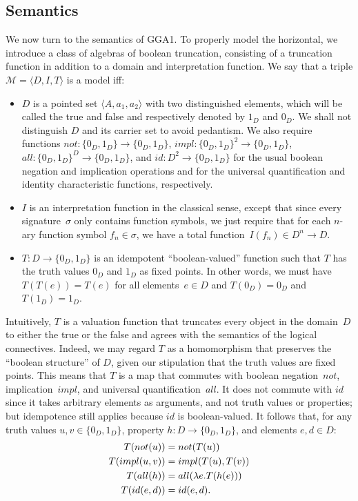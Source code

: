 \documentclass{preprint}
\newcommand{\bool}{\{0_D,1_D\}}
\newcommand{\GGA}{\textsf{GGA1}}
\begin{document}
\subsection{Semantics} \label{semantics}

We now turn to the semantics of \GGA. To properly model the horizontal, we introduce a class of algebras of boolean truncation, consisting of a truncation function in addition to a domain and interpretation function. 
We say that a triple $\mathcal{M} = \langle D, I, T\rangle$ is a model iff:


\begin{itemize}
	\item $D$ is a pointed set $\langle A, a_1, a_2 \rangle$ with two distinguished elements, which will be called the true and false and respectively denoted by $1_D$ and $0_D$.  We shall not distinguish $D$ and its carrier set to avoid pedantism. 
	We also require functions $not : \bool \rightarrow \bool$, $impl : \bool^2 \rightarrow \bool$, $all : \bool^D \rightarrow \bool$, and $id : D^2 \rightarrow \bool$ for the usual boolean negation and implication operations and for the universal quantification and identity characteristic functions, respectively. 
	

	\item $I$ is an interpretation function in the classical sense, except that since every signature~$\sigma$ only contains function symbols, we just require that for each $n$-ary function symbol $f_n \in \sigma$, we have a total function~$I(f_n) \in D^n \rightarrow D$. 
	
	\item $T : D \rightarrow \{0_D, 1_D\}$ is an idempotent ``boolean-valued'' function such that $T$ has the truth values $0_D$ and $1_D$ as fixed points. In other words, we must have $T(T(e))=T(e)$ for all elements~$e \in D$ and $T(0_D)=0_D$ and $T(1_D)=1_D$. 
\end{itemize}

Intuitively, $T$ is a valuation function that truncates every object in the domain~$D$ to either the true or the false and agrees with the semantics of the logical connectives. Indeed, we may regard $T$ as a homomorphism that preserves the ``boolean structure'' of $D$, given our stipulation that the truth values are fixed points. This means that $T$ is a map that commutes with boolean negation~$not$, implication~$impl$, and universal quantification~$all$. It does not commute with $id$ since it takes arbitrary elements as arguments, and not truth values or properties; but idempotence still applies because $id$ is boolean-valued. 
It follows that, for any truth values $u, v \in \bool$, property $h : D \rightarrow \bool$, and elements $e, d \in D$:
\begin{align*}
	T(not(u))&= not(T(u)) \\						
	T(impl(u,v))&= impl(T(u),T(v)) \\				
	T(all(h))&= all(\lambda e.{T(h(e))}) \\ 		
	T(id(e, d))&= id(e, d). 						
\end{align*}
\end{document}

